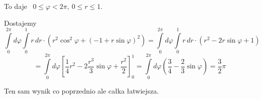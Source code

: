 \begin{przykladbig}
    To daje \ $ 0 \leq \varphi < 2\pi, \ 0 \leq r \leq 1 $.

    Dostajemy
    \[ \int\limits_{0}^{2\pi} d \varphi \int\limits_{0}^{1} r \, dr \cdot (r^2 \cos^2 \varphi + (-1 + r \sin \varphi)^2) 
    = \int\limits_{0}^{2\pi} d \varphi \int\limits_{0}^{1} r \, dr \cdot (r^2 - 2r \sin \varphi + 1) \]
    \[ = \int\limits_{0}^{2\pi} d \varphi \left[ \frac{1}{4} r^2 - 2 \frac{r^3}{3} \sin \varphi + \frac{r^2}{2} \right]_0^1
    = \int\limits_{0}^{2\pi} d \varphi \left( \frac{3}{4} - \frac{2}{3} \sin \varphi \right) = \frac{3}{2} \pi \]

    Ten sam wynik co poprzednio ale całka łatwiejsza.
\end{przykladbig}